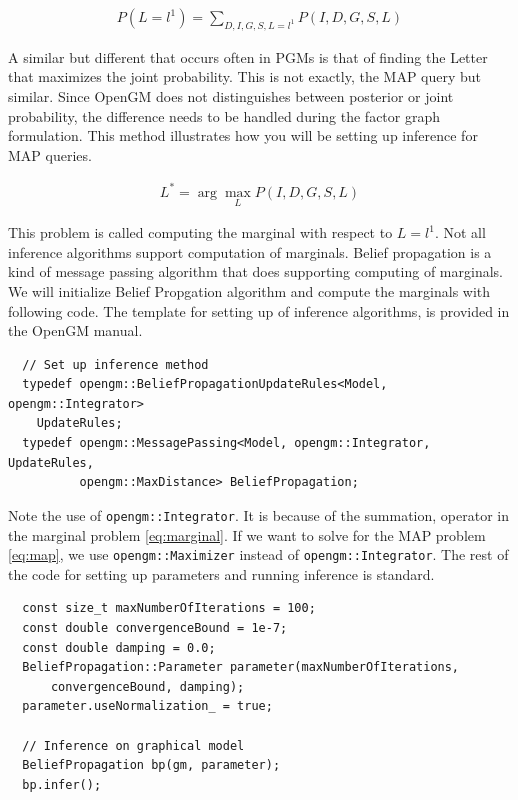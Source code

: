 \documentclass[12pt,oneside,letterpaper]{article}
\begin{document}
\begin{align}
  P(L = l^1) = \sum_{D,I,G,S,L=l^1} P(I, D, G, S, L)
  \label{eq:marginal}
\end{align}

A similar but different that occurs often in PGMs is that of finding the Letter
that maximizes the joint probability. This is not exactly, the MAP query but
similar. Since OpenGM does not distinguishes between posterior or joint
probability, the difference needs to be handled during the factor graph
formulation. This method illustrates how you will be setting up inference for
MAP queries. 

\begin{align}
  L^* = \arg \max_{L} P(I, D, G, S, L)
  \label{eq:map}
\end{align}

This problem is called computing the marginal with respect to $L = l^1$. Not
all inference algorithms support computation of marginals. Belief propagation
is a kind of message passing algorithm that does supporting computing of
marginals. We will initialize Belief Propgation algorithm and compute the
marginals with following code. The template for setting up of inference
algorithms, is provided in the OpenGM manual. 

\begin{lstlisting}
  // Set up inference method
  typedef opengm::BeliefPropagationUpdateRules<Model, opengm::Integrator>
    UpdateRules;
  typedef opengm::MessagePassing<Model, opengm::Integrator, UpdateRules,
          opengm::MaxDistance> BeliefPropagation;
\end{lstlisting}

Note the use of \lstinline|opengm::Integrator|. It is because of the summation,
operator in the marginal problem \eqref{eq:marginal}. If we want to
solve for the MAP problem \eqref{eq:map}, we use \lstinline|opengm::Maximizer| 
instead of \lstinline|opengm::Integrator|. The rest of the code for setting up parameters and running inference is standard.

\begin{lstlisting}
  const size_t maxNumberOfIterations = 100;
  const double convergenceBound = 1e-7;
  const double damping = 0.0;
  BeliefPropagation::Parameter parameter(maxNumberOfIterations,
      convergenceBound, damping);
  parameter.useNormalization_ = true;

  // Inference on graphical model
  BeliefPropagation bp(gm, parameter);
  bp.infer();

\end{lstlisting}
\end{document}
